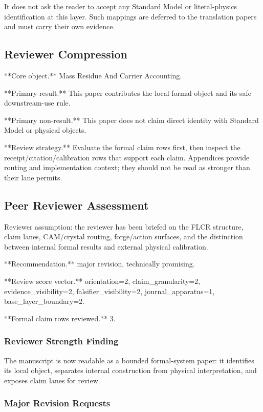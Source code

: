 \documentclass[11pt]{article}
\begin{document}
It does not ask the reader to accept any Standard Model or literal-physics identification at this layer. Such mappings are deferred to the translation papers and must carry their own evidence.

\subsection*{Reviewer Compression}

**Core object.** Mass Residue And Carrier Accounting.

**Primary result.** This paper contributes the local formal object and its safe downstream-use rule.

**Primary non-result.** This paper does not claim direct identity with Standard Model or physical objects.

**Review strategy.** Evaluate the formal claim rows first, then inspect the receipt/citation/calibration rows that support each claim. Appendices provide routing and implementation context; they should not be read as stronger than their lane permits.

\subsection*{Peer Reviewer Assessment}

Reviewer assumption: the reviewer has been briefed on the FLCR structure, claim lanes, CAM/crystal routing, forge/action surfaces, and the distinction between internal formal results and external physical calibration.

**Recommendation.** major revision, technically promising.

**Review score vector.** orientation=2, claim\_granularity=2, evidence\_visibility=2, falsifier\_visibility=2, journal\_apparatus=1, base\_layer\_boundary=2.

**Formal claim rows reviewed.** 3.

\subsubsection*{Reviewer Strength Finding}

The manuscript is now readable as a bounded formal-system paper: it identifies its local object, separates internal construction from physical interpretation, and exposes claim lanes for review.

\subsubsection*{Major Revision Requests}
\end{document}
